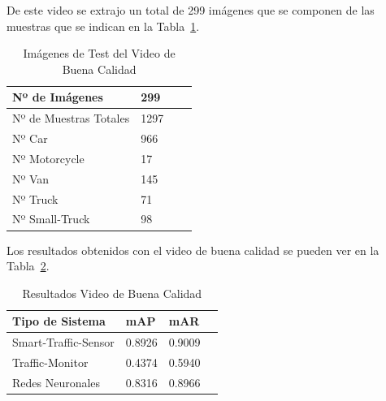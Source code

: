 De este video se extrajo un total de 299 imágenes que se componen de las muestras que se indican en la Tabla~\ref{tabla_video_bueno}.

\begin{table}[htbp]
\begin{center}
\begin{tabular}{|l|l|l|l|}
\hline
Nº de Imágenes  & 299 \\
\hline \hline
Nº de Muestras Totales & 1297\\ \hline
Nº Car & 966 \\ \hline
Nº Motorcycle & 17 \\ \hline
Nº Van & 145 \\ \hline
Nº Truck & 71 \\ \hline
Nº Small-Truck & 98 \\ \hline
\end{tabular}
\caption{Imágenes de Test del Video de Buena Calidad}
\label{tabla_video_bueno}
\end{center}
\end{table}

Los resultados obtenidos con el video de buena calidad se pueden ver en la Tabla~\ref{resultados_video_bueno}.

\begin{table}[htbp]
\begin{center}
\begin{tabular}{|l|l|l|l|}
\hline
Tipo de Sistema & mAP & mAR  \\ 
\hline \hline
Smart-Traffic-Sensor & 0.8926 & 0.9009 \\ \hline
Traffic-Monitor & 0.4374 & 0.5940 \\ \hline
Redes Neuronales & 0.8316 & 0.8966\\ \hline
\end{tabular}
\caption{Resultados Video de Buena Calidad}
\label{resultados_video_bueno}
\end{center}
\end{table}

